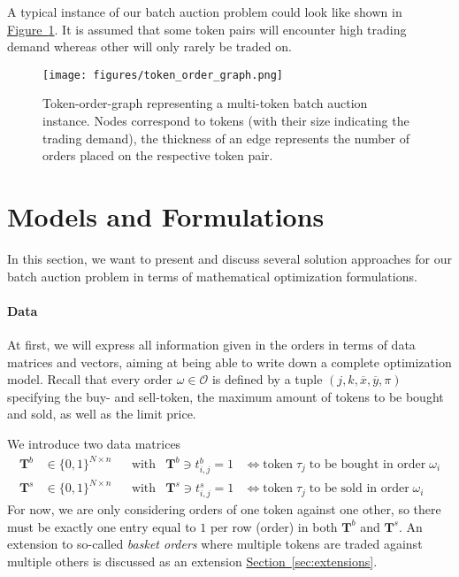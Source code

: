 \documentclass[11pt,parskip=full]{scrartcl}%
\newcommand*{\orders}{\mathcal{O}}          %
\newcommand*{\figref}[1]{\hyperref[{#1}]{Figure~\ref*{#1}}}
\newcommand*{\secref}[1]{\hyperref[{#1}]{Section~\ref*{#1}}}
\begin{document}
A typical instance of our batch auction problem could look like shown in 
\figref{fig:order-token-graph}.
It is assumed that some token pairs will encounter high trading demand whereas other will only
rarely be traded on.

\begin{figure}[h!]
  \centering
  \texttt{[image: figures/token\_order\_graph.png]}
  \caption{Token-order-graph representing a multi-token batch auction instance. Nodes correspond
  to tokens (with their size indicating the trading demand), the thickness of an edge represents 
  the number of orders placed on the respective token pair.}
  \label{fig:order-token-graph}
\end{figure}


\clearpage
\section{Models and Formulations}
\label{sec:models}

In this section, we want to present and discuss several solution approaches for our batch auction
problem in terms of mathematical optimization formulations.

\vspace{-.2cm}
\paragraph{Data}

At first, we will express all information given in the orders in terms of data matrices and
vectors, aiming at being able to write down a complete optimization model.
Recall that every order $ \omega \in \orders $ is defined by a tuple
$ (j,k,\overline{x},\overline{y},\pi) $ specifying the buy- and sell-token, the maximum amount of
tokens to be bought and sold, as well as the limit price.

We introduce two data matrices
\begin{align*}
  \mathbf{T}^b &\in \{0,1\}^{N \times n} && \text{with} & \mathbf{T}^b \ni t^b_{i,j} = 1
  &\Leftrightarrow
  \text{token} \; \tau_j \; \text{to be bought in order} \; \omega_i \\
  \mathbf{T}^s &\in \{0,1\}^{N \times n} && \text{with} & \mathbf{T}^s \ni t^s_{i,j} = 1
  &\Leftrightarrow
  \text{token} \; \tau_j \; \text{to be sold in order} \; \omega_i
\end{align*}
For now, we are only considering orders of one token against one other, so there must be exactly
one entry equal to $ 1 $ per row (order) in both $ \mathbf{T}^b $ and $ \mathbf{T}^s $.
An extension to so-called \emph{basket orders} where multiple tokens are traded against multiple
others is discussed as an extension \secref{sec:extensions}.
\end{document}
